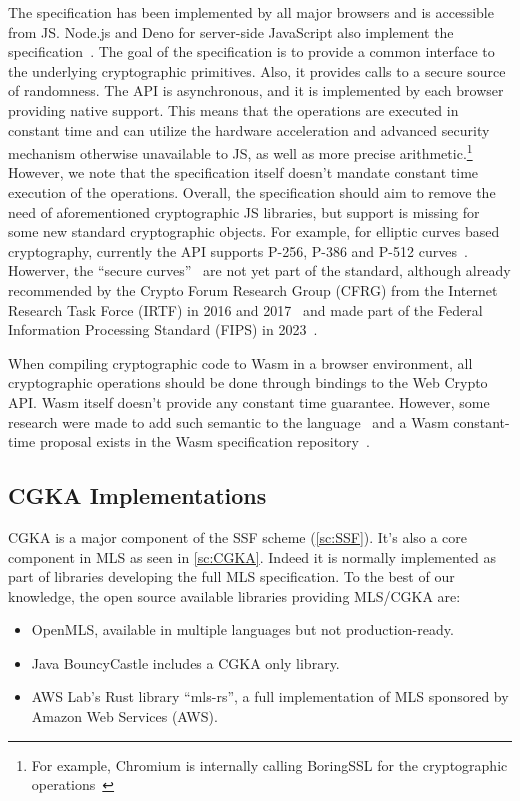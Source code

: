 The specification has been implemented by all major browsers
and is accessible from JS. 
Node.js and Deno for server-side JavaScript also implement the specification~\cite{NodeJsWebCryptoAPI, DenoWebCryptoAPI}.
The goal of the specification
is to provide a common interface to the underlying 
cryptographic primitives. Also, it provides calls to
a secure source of randomness. 
The API is asynchronous, and it is implemented by each
browser providing native support. This means that the
operations are executed in constant time and can
utilize the hardware acceleration and advanced
security mechanism otherwise unavailable to JS, as well as
more precise arithmetic.\footnote{For example, Chromium is internally calling BoringSSL for the cryptographic operations~\cite{ChromiumWebCryptoAPIImplementation}}
However, we note that the specification itself doesn't mandate
constant time execution of the operations.
Overall, the specification should aim to 
remove the need of aforementioned cryptographic JS libraries,
but support is missing for some new standard cryptographic objects. 
For example, for elliptic curves based cryptography, currently
the API supports P-256, P-386 and P-512 curves~\cite{WebCryptoAPICurvesSupport}.
Howerver, the ``secure curves''~\cite{WebCryptoAPISecureCurvesDraft,WebCryptoAPISecureCurvesExplainer}
are not yet part of the standard, although already recommended by
the Crypto Forum Research Group (CFRG) from the Internet Research
Task Force (IRTF) in 2016 and 2017~\cite{RFC7748IRTF, RFC8032IRTF}
and made part of the Federal Information Processing Standard (FIPS) in 2023~\cite{SecureCurvesNIST}.

When compiling cryptographic code to Wasm in a browser environment,
all cryptographic operations should be done through bindings to
the Web Crypto API. Wasm itself doesn't provide any constant time
guarantee. However, some research were made to add such semantic
to the language~\cite{CTWasm, gu2023constanttimewasmtimerealtime}
and a Wasm constant-time proposal exists in the Wasm specification
repository~\cite{WasmCTProposal}.

\subsection{CGKA Implementations}\label{sc:CGKA-implementations}

CGKA is a major component of the SSF scheme (\cref{sc:SSF}).
It's also a core component in MLS as seen in \cref{sc:CGKA}.
Indeed it is normally implemented as part of libraries developing
the full MLS specification.
To the best of our knowledge, the open source available libraries
providing MLS/CGKA are:
\begin{itemize}
    \item OpenMLS, available in multiple languages but not production-ready.
    \item Java BouncyCastle includes a CGKA only library.
    \item AWS Lab's Rust library ``mls-rs'', a full implementation of MLS sponsored by Amazon Web Services (AWS). 
\end{itemize}


